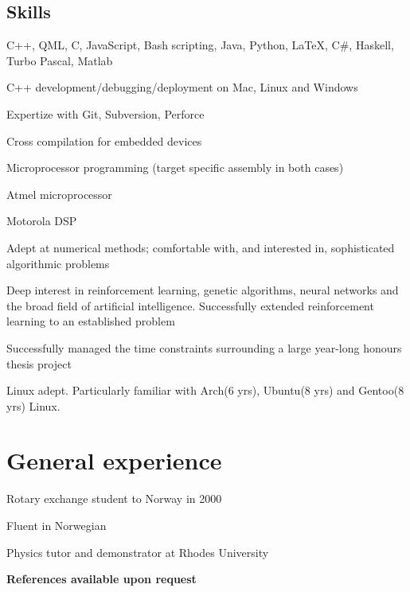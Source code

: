 \documentclass{article}
\begin{document}
\subsection*{Skills}
\begin{itemize*}
\item{ C++, QML, C, JavaScript, Bash scripting, Java, Python, \LaTeX, C\#, Haskell, Turbo Pascal, Matlab}
\item{ C++ development/debugging/deployment on Mac, Linux and Windows}
\item{ Expertize with Git, Subversion, Perforce}
\item{ Cross compilation for embedded devices}
\item{ Microprocessor programming (target specific assembly in both cases) }
\begin{itemize*}
\item{ Atmel microprocessor}
\item{ Motorola DSP}
\end{itemize*}
\item{ Adept at numerical methods; comfortable with, and interested in, sophisticated algorithmic problems}
\item{ Deep interest in reinforcement learning, genetic algorithms, neural networks and the broad field of artificial intelligence. Successfully extended reinforcement learning to an established problem}
\item{ Successfully managed the time constraints surrounding a large year-long honours thesis project}
\item{ Linux adept. Particularly familiar with Arch(6 yrs), Ubuntu(8 yrs) and Gentoo(8 yrs) Linux.}
\end{itemize*}

\section*{General experience}
\begin{itemize*}
\item{	Rotary exchange student to Norway in 2000}
\item{	Fluent in Norwegian}
\item{	Physics tutor and demonstrator at Rhodes University}
\end{itemize*}

\textbf{References available upon request}
 
\end{document}
